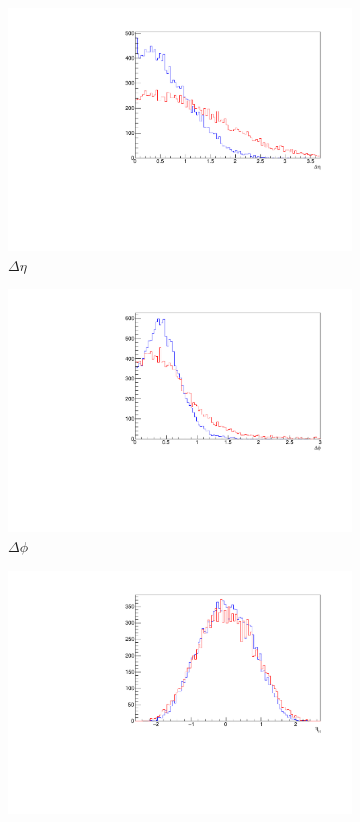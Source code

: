 \begin{figure}[htbp]
\begin{subfigure}[b]{0.3\textwidth}
	                \includegraphics[width=\textwidth]{img/deta}
	                \caption{$\Delta\eta$}
	                \label{fig:deta}
	\end{subfigure}
	\begin{subfigure}[b]{0.3\textwidth}
	                \includegraphics[width=\textwidth]{img/dphi}
	                \caption{$\Delta\phi$}
	                \label{fig:dphi}
	\end{subfigure}	
	\begin{subfigure}[b]{0.3\textwidth}
	                \includegraphics[width=\textwidth]{img/etah}

\end{subfigure}
\end{figure}
